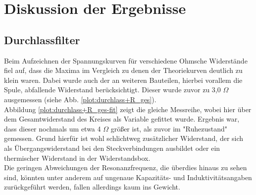 \section{Diskussion der Ergebnisse}

\subsection{Durchlassfilter}
Beim Aufzeichnen der Spannungskurven für verschiedene Ohmsche Widerstände fiel auf, dass die Maxima im Vergleich zu denen der Theoriekurven deutlich zu klein waren. Dabei wurde auch der an weiteren Bauteilen, hierbei vorallem die Spule, abfallende Widerstand berücksichtigt. Dieser wurde zuvor zu 3,0 $  \Omega $ ausgemessen (siehe Abb. \ref{plot:durchlass+R_ges}).\\
Abbildung \ref{plot:durchlass+R_ges-fit} zeigt die gleiche Messreihe, wobei hier über dem Gesamtwiderstand des Kreises als Variable gefittet wurde. Ergebnis war, dass dieser nochmals um etwa 4 $  \Omega $ größer ist, als zuvor im "Ruhezustand" gemessen. Grund hierfür ist wohl schlichtweg zusätzlicher Widerstand, der sich als Übergangswiderstand bei den Steckverbindungen ausbildet oder ein thermischer Widerstand in der Widerstandsbox.\\
Die geringen Abweichungen der Resonanzfrequenz, die überdies hinaus zu sehen sind, könnten unter anderem auf ungenaue Kapazitäts- und Induktivitätsangaben zurückgeführt werden, fallen allerdings kaum ins Gewicht.
